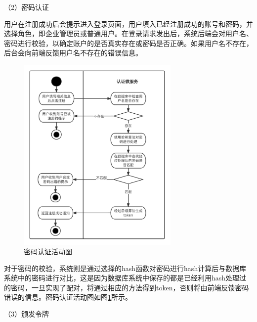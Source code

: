 （2）密码认证

用户在注册成功后会提示进入登录页面，用户填入已经注册成功的账号和密码，并选择角色，即企业管理员或普通用户。在登录请求发出后，系统后端会对用户名、
密码进行校验，以确定账户的是否真实存在或密码是否正确。如果用户名不存在，后台会向前端反馈用户名不存在的错误信息。
\begin{figure}[h]
    \centering
    \includegraphics[width=0.7\textwidth]{my_figures/chapter4/用户名密码认证活动图.png}
    \caption{密码认证活动图}
    \label{fig:用户名密码认证活动图}
\end{figure}
对于密码的校验，系统则是通过选择的hash函数对密码进行hash计算后与数据库系统中的密码进行对比，这是因为数据库系统中保存的都是已经利用hash处理过
的密码，一旦实现了配对，将通过相应的方法得到token，否则将由前端反馈密码错误的信息。密码认证活动图如图\ref{fig:用户名密码认证活动图}所示。


（3）颁发令牌

